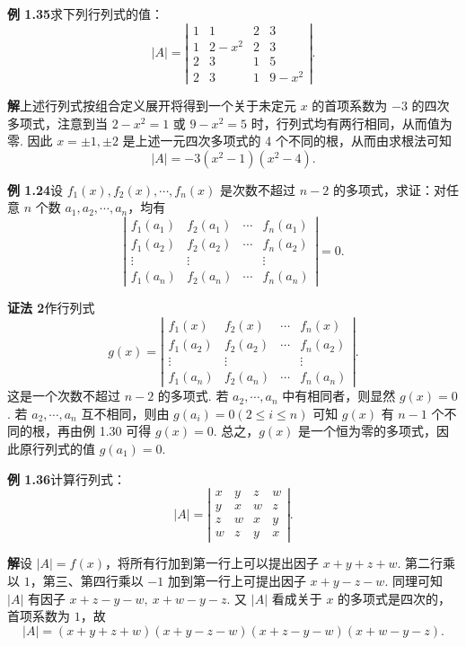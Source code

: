 \documentclass[UTF8,12pt,a4paper,fontset=fandol]{ctexart}
\begin{document}
\noindent\textbf{例 1.35}\quad 求下列行列式的值：
\[
|A|=\left|\begin{array}{cccc}
1 & 1 & 2 & 3\\
1 & 2-x^2 & 2 & 3\\
2 & 3 & 1 & 5\\
2 & 3 & 1 & 9-x^2
\end{array}\right|.
\]

\noindent\textbf{解}\quad 上述行列式按组合定义展开将得到一个关于未定元 $x$ 的首项系数为 $-3$ 的四次多项式，注意到当 $2-x^2=1$ 或 $9-x^2=5$ 时，行列式均有两行相同，从而值为零. 因此 $x=\pm1,\pm2$ 是上述一元四次多项式的 4 个不同的根，从而由求根法可知
\[
|A|=-3(x^2-1)(x^2-4).
\]

\noindent\textbf{例 1.24}\quad 设 $f_1(x),f_2(x),\cdots,f_n(x)$ 是次数不超过 $n-2$ 的多项式，求证：对任意 $n$ 个数 $a_1,a_2,\cdots,a_n$，均有
\[
\left|\begin{array}{cccc}
f_1(a_1) & f_2(a_1) & \cdots & f_n(a_1)\\
f_1(a_2) & f_2(a_2) & \cdots & f_n(a_2)\\
\vdots & \vdots &        & \vdots\\
f_1(a_n) & f_2(a_n) & \cdots & f_n(a_n)
\end{array}\right|=0.
\]

\noindent\textbf{证法 2}\quad 作行列式
\[
g(x)=\left|\begin{array}{cccc}
f_1(x) & f_2(x) & \cdots & f_n(x)\\
f_1(a_2) & f_2(a_2) & \cdots & f_n(a_2)\\
\vdots & \vdots &        & \vdots\\
f_1(a_n) & f_2(a_n) & \cdots & f_n(a_n)
\end{array}\right|.
\]
这是一个次数不超过 $n-2$ 的多项式. 若 $a_2,\cdots,a_n$ 中有相同者，则显然 $g(x)=0$. 若 $a_2,\cdots,a_n$ 互不相同，则由 $g(a_i)=0(2\le i\le n)$ 可知 $g(x)$ 有 $n-1$ 个不同的根，再由例 1.30 可得 $g(x)=0$. 总之，$g(x)$ 是一个恒为零的多项式，因此原行列式的值 $g(a_1)=0$.

\noindent\textbf{例 1.36}\quad 计算行列式：
\[
|A|=\left|\begin{array}{cccc}
x & y & z & w\\
y & x & w & z\\
z & w & x & y\\
w & z & y & x
\end{array}\right|.
\]

\noindent\textbf{解}\quad 设 $|A|=f(x)$，将所有行加到第一行上可以提出因子 $x+y+z+w$. 第二行乘以 $1$，第三、第四行乘以 $-1$ 加到第一行上可提出因子 $x+y-z-w$. 同理可知 $|A|$ 有因子 $x+z-y-w,\ x+w-y-z$. 又 $|A|$ 看成关于 $x$ 的多项式是四次的，首项系数为 $1$，故
\[
|A|=(x+y+z+w)(x+y-z-w)(x+z-y-w)(x+w-y-z).
\]
\end{document}
